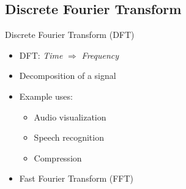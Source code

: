 \documentclass[xcolor={table}]{beamer}
\begin{document}
\subsection{Discrete Fourier Transform}
\begin{frame}{Discrete Fourier Transform (DFT)}
    \begin{itemize}
        \item DFT: \textit{Time} $\Rightarrow$ \textit{Frequency}
        \item Decomposition of a signal
        \item Example uses:
            \begin{itemize}
                \item Audio visualization
                \item Speech recognition
                \item Compression
            \end{itemize}
        \item Fast Fourier Transform (FFT)
    \end{itemize}

\end{frame}

%     

%     
\end{document}

